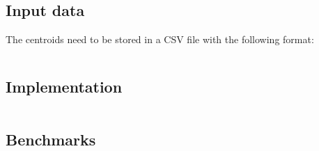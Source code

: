 \subsection{Input data}

The centroids need to be stored in a CSV file with the following format:

\begin{listing}[H]
\inputminted{raw}{resources/codes/data.csv}
\end{listing}


\newpage

\subsection{Implementation}

\begin{listing}[H]
\inputminted{cpp}{resources/codes/simple.cpp}
\end{listing}

\newpage

\subsection{Benchmarks}